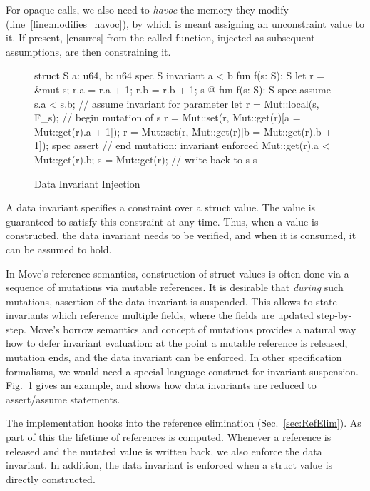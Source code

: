 For opaque calls, we also need to \emph{havoc} the memory they modify
(line~\ref{line:modifies_havoc}), by which is meant assigning an unconstraint
value to it. If present, |ensures| from the called function, injected as
subsequent assumptions, are then constraining it.



\begin{figure}[t!]
  \caption{Data Invariant Injection}
  \label{fig:DataInvariants}
  \centering
\begin{MoveBox}
  struct S { a: u64, b: u64 }
  spec S { invariant a < b }
  fun f(s: S): S { let r = &mut s; r.a = r.a + 1; r.b = r.b + 1; s }
  @\transform@
  fun f(s: S): S {
    spec assume s.a < s.b;      // assume invariant for parameter
    let r = Mut::local(s, F_s); // begin mutation of s
    r = Mut::set(r, Mut::get(r)[a = Mut::get(r).a + 1]);
    r = Mut::set(r, Mut::get(r)[b = Mut::get(r).b + 1]);
    spec assert                 // end mutation: invariant enforced
      Mut::get(r).a < Mut::get(r).b;
    s = Mut::get(r);            // write back to s
    s
  }
\end{MoveBox}
\end{figure}

A data invariant specifies a constraint over a struct value. The value is
guaranteed to satisfy this constraint at any time. Thus, when a value is
constructed, the data invariant needs to be verified, and when it is consumed,
it can be assumed to hold.

In Move's reference semantics, construction of struct values is often done via a
sequence of mutations via mutable references. It is desirable that \emph{during}
such mutations, assertion of the data invariant is suspended. This allows to
state invariants which reference multiple fields, where the fields are updated
step-by-step.  Move's borrow semantics and concept of mutations provides a
natural way how to defer invariant evaluation: at the point a mutable reference
is released, mutation ends, and the data invariant can be enforced.  In other
specification formalisms, we would need a special language construct for
invariant suspension. Fig.~\ref{fig:DataInvariants} gives an example, and shows
how data invariants are reduced to assert/assume statements.


The implementation hooks into the reference elimination
(Sec.~\ref{sec:RefElim}). As part of this the lifetime of references is
computed. Whenever a reference is released and the mutated value is written
back, we also enforce the data invariant. In addition, the data invariant is
enforced when a struct value is directly constructed.







\label{sec:GlobalInvariants}




